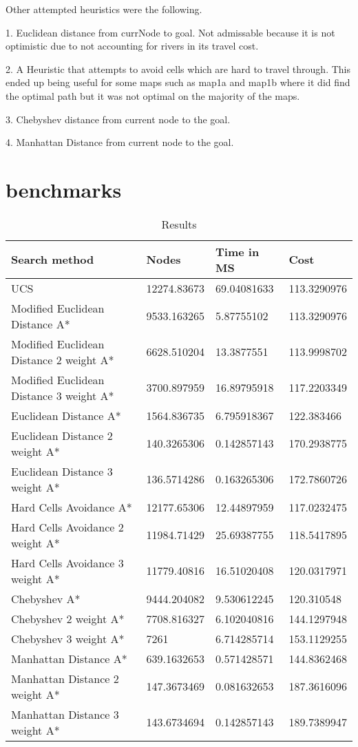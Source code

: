\documentclass[11pt]{article} %
\begin{document}
Other attempted heuristics were the following.

1. Euclidean distance from currNode to goal. Not admissable because it is not optimistic due to not accounting for rivers in its travel cost.

2. A Heuristic that attempts to avoid cells which are hard to travel through. This ended up being useful for some maps such as map1a and map1b where it did find the optimal path but it was not optimal on the majority of the maps.

3. Chebyshev distance from current node to the goal.

4. Manhattan Distance from current node to the goal.

\section{benchmarks}
\begin{table}[htbp]
  \centering
  \caption{Results}
    \begin{tabular}{|l|l|l|l|}
	\hline
        Search method  &  Nodes & Time in MS & Cost \\
\hline
    UCS   & 12274.83673 & 69.04081633 & 113.3290976 \\
\hline
    Modified Euclidean Distance A* & 9533.163265 & 5.87755102 & 113.3290976 \\
\hline    Modified Euclidean Distance 2 weight A* & 6628.510204 & 13.3877551 & 113.9998702 \\
\hline    Modified Euclidean Distance 3 weight A* & 3700.897959 & 16.89795918 & 117.2203349 \\
\hline    Euclidean Distance A* & 1564.836735 & 6.795918367 & 122.383466 \\
\hline    Euclidean Distance 2 weight A* & 140.3265306 & 0.142857143 & 170.2938775 \\
\hline    Euclidean Distance 3 weight A* & 136.5714286 & 0.163265306 & 172.7860726 \\
\hline    Hard Cells Avoidance A* & 12177.65306 & 12.44897959 & 117.0232475 \\
\hline    Hard Cells Avoidance 2 weight A* & 11984.71429 & 25.69387755 & 118.5417895 \\
\hline    Hard Cells Avoidance 3 weight A* & 11779.40816 & 16.51020408 & 120.0317971 \\
\hline    Chebyshev A* & 9444.204082 & 9.530612245 & 120.310548 \\
\hline    Chebyshev 2 weight A* & 7708.816327 & 6.102040816 & 144.1297948 \\
\hline    Chebyshev 3 weight A* & 7261  & 6.714285714 & 153.1129255 \\
\hline    Manhattan Distance A* & 639.1632653 & 0.571428571 & 144.8362468 \\
\hline    Manhattan Distance 2 weight A* & 147.3673469 & 0.081632653 & 187.3616096 \\
\hline    Manhattan Distance 3 weight A* & 143.6734694 & 0.142857143 & 189.7389947 \\
\hline
    \end{tabular}%
  \label{tab:addlabel}%
\end{table}%
\end{document}
